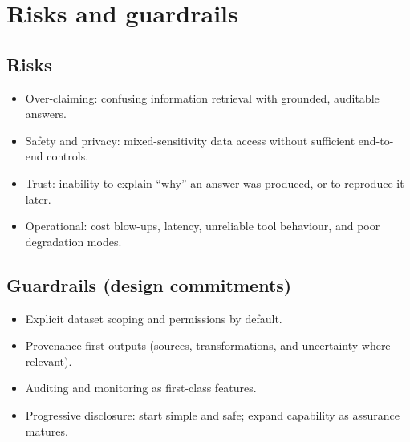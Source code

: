 \section{Risks and guardrails}

\subsection{Risks}
\begin{itemize}[leftmargin=*]
  \item Over-claiming: confusing information retrieval with grounded, auditable answers.\cite{owasp_llm_top10,ncsc_secure_ai_guidelines}
  \item Safety and privacy: mixed-sensitivity data access without sufficient end-to-end controls.\cite{ico_ai_data_protection,ncsc_secure_ai_guidelines,five_safes_framework}
  \item Trust: inability to explain ``why'' an answer was produced, or to reproduce it later.\cite{prov_o,prov_dm,algorithmic_transparency_recording_standard}
  \item Operational: cost blow-ups, latency, unreliable tool behaviour, and poor degradation modes.\cite{ncsc_secure_ai_guidelines,owasp_llm_top10}
\end{itemize}

\subsection{Guardrails (design commitments)}
\begin{itemize}[leftmargin=*]
  \item Explicit dataset scoping and permissions by default.\cite{five_safes_framework,ico_ai_data_protection}
  \item Provenance-first outputs (sources, transformations, and uncertainty where relevant).\cite{prov_o,prov_dm}
  \item Auditing and monitoring as first-class features.\cite{algorithmic_transparency_recording_standard,ncsc_secure_ai_guidelines}
  \item Progressive disclosure: start simple and safe; expand capability as assurance matures.\cite{data_ai_ethics_framework}
\end{itemize}
